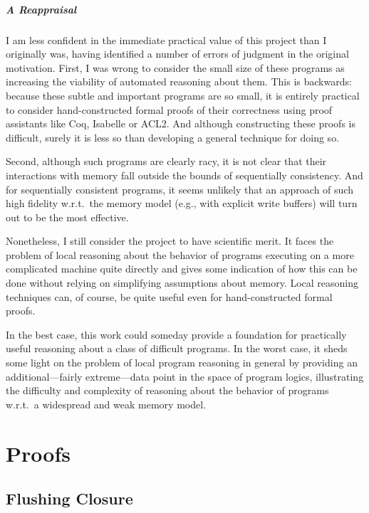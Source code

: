 \documentclass[11pt]{report}
\begin{document}
\paragraph{A Reappraisal}

I am less confident in the immediate practical value of this project than I originally was, having identified a number of errors of judgment in the original motivation. First, I was wrong to consider the small size of these programs as increasing the viability of automated reasoning about them. This is backwards: because these subtle and important programs are so small, it is entirely practical to consider hand-constructed formal proofs of their correctness using proof assistants like Coq, Isabelle or ACL2. And although constructing these proofs is difficult, surely it is less so than developing a general technique for doing so. 

Second, although such programs are clearly racy, it is not clear that their interactions with memory fall outside the bounds of sequentially consistency. And for sequentially consistent programs, it seems unlikely that an approach of such high fidelity w.r.t.~the memory model (e.g., with explicit write buffers) will turn out to be the most effective. 

Nonetheless, I still consider the project to have scientific merit. It faces the problem of local reasoning about the behavior of programs executing on a more complicated machine quite directly and gives some indication of how this can be done without relying on simplifying assumptions about memory. Local reasoning techniques can, of course, be quite useful even for hand-constructed formal proofs. 

In the best case, this work could someday provide a foundation for practically useful reasoning about a class of difficult programs. In the worst case, it sheds some light on the problem of local program reasoning in general by providing an additional---fairly extreme---data point in the space of program logics, illustrating the difficulty and complexity of reasoning about the behavior of programs w.r.t.~a widespread and weak memory model. 



 

\appendix

\chapter{Proofs}

\section{Flushing Closure}
\end{document}
